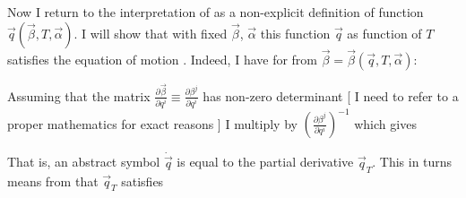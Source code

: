 \documentclass{article}
\begin{document}
\par
Now I return to the interpretation of  as a non-explicit
definition of function $\vec{q}(\vec{\beta}, T, \vec{\alpha})$. I will show 
that with fixed $\vec{\beta}$, $\vec{\alpha}$ this function $\vec{q}$ as
function of $T$ satisfies the equation of motion . Indeed, I have
for 
from $\vec{\beta} = \vec{\beta}(\vec{q}, T, \vec{\alpha})$:


\par
Assuming that the matrix
$\frac{\partial\vec{\beta}}{\partial q^i} 
\equiv \frac{\partial\beta^j}{\partial q^i}$ has non-zero determinant
[ I need to refer to a proper mathematics for exact reasons ]
I multiply  by 
$\left(\frac{\partial\beta^j}{\partial q^i}\right)^{-1}$ which gives

That is, an abstract symbol $\dot{\vec{q}}$ is equal to the partial derivative
$\vec{q}_T$. This in turns means from  that $\vec{q}_T$ satisfies
\end{document}
